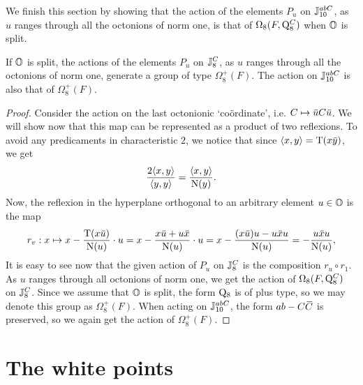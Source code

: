We finish this section by showing that the action of the elements $P_u$ on $\mathbb{J}_{10}^{abC}$, 
as $u$ ranges
through all the octonions of norm one, is that of $\Omega_8(F,\mathord{\mathrm{Q}}_8^C)$ when $\mathbb{O}$ is split.

\begin{lemma}
	\label{lemma:1_spin8plus}
	If $\mathbb{O}$ is split, the actions of the elements $P_u$ on 
	$\mathbb{J}_8^C$, as $u$ ranges through	all the octonions of norm one, 
	generate a group of type 
	$\Omega_8^+(F)$. The action on $\mathbb{J}_{10}^{abC}$ is also that 
	of $\Omega_8^+(F)$.
\end{lemma}

\begin{proof}
Consider the action on the last octonionic `co\"{o}rdinate', i.e.
$C \mapsto \ovu   C \ovu  $. We will show now that this map can be represented as a
product of two reflexions. To avoid any predicaments in characteristic $2$, we notice that
since $\langle x,y \rangle = \operatorname{T}(x\mathord{\mbox{\hspace*{0pt}}\,\overline{\!y\!\!\;}\!\:}\mbox{\hspace*{0pt}} )$, we get
\begin{equation}
\frac{2 \langle x, y \rangle}{\langle y,y \rangle} =
\frac{\langle x, y \rangle}{\mathord{\mathrm{N}}(y)}.
\end{equation}
Now, the reflexion in the hyperplane orthogonal to an arbitrary element $u\in \mathbb{O}$ is the map
\begin{equation}
    r_v : x \mapsto     x - \frac{\Tr(x \ovu  )}{\NN(u)} \cdot u =
	 x - \frac{ x\ovu  + u\ovx  }{\NN(u)} \cdot u =
    x - \frac{(x\ovu  )u - u\ovx u}{\NN(u)} = - \frac{u\ovx u}{\NN(u)},
\end{equation}
It is easy to see now that the given
action of $P_u$ on $\mathbb{J}_8^C$ is the composition $r_u \circ r_1$. As $u$ ranges through all 
octonions of norm one, we get the action of $\Omega_8(F,\mathord{\mathrm{Q}}_8^C)$ on $\mathbb{J}_8^C$. Since we
assume that $\mathbb{O}$ is split, the form $\mathord{\mathrm{Q}}_8$ is of plus type, so we may denote this
group as $\Omega_8^+(F)$. When acting on $\mathbb{J}_{10}^{abC}$, the form $ab-C\mathord{\mbox{\hspace*{0pt}}\,\overline{\!C\!\!\;}\!\:}\mbox{\hspace*{0pt}}$ is
preserved, so we again get the action of $\Omega_8^+(F)$.
\end{proof}

\section{The white points}
